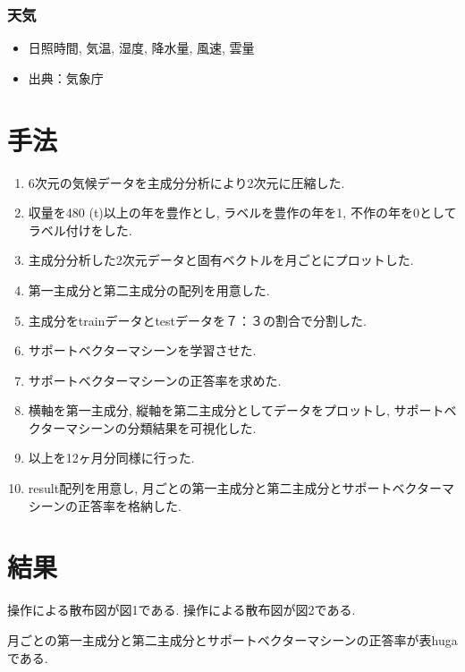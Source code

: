 \documentclass[
]{article}
\begin{document}
\hypertarget{header-n2019}{%
\subsubsection{天気}\label{header-n2019}}

\begin{itemize}
\item
  日照時間, 気温, 湿度, 降水量, 風速, 雲量
\item
  出典：気象庁
\end{itemize}

\hypertarget{header-n2026}{%
\section{手法}\label{header-n2026}}

\begin{enumerate}
\def\labelenumi{\arabic{enumi}.}
\item
  6次元の気候データを主成分分析により2次元に圧縮した.
\item
  収量を480 (t)以上の年を豊作とし, ラベルを豊作の年を1,
  不作の年を0としてラベル付けをした.
\item
  主成分分析した2次元データと固有ベクトルを月ごとにプロットした.
\item
  第一主成分と第二主成分の配列を用意した.
\item
  主成分をtrainデータとtestデータを７：３の割合で分割した.
\item
  サポートベクターマシーンを学習させた.
\item
  サポートベクターマシーンの正答率を求めた.
\item
  横軸を第一主成分, 縦軸を第二主成分としてデータをプロットし,
  サポートベクターマシーンの分類結果を可視化した.
\item
  以上を12ヶ月分同様に行った.
\item
  result配列を用意し,
  月ごとの第一主成分と第二主成分とサポートベクターマシーンの正答率を格納した.
\end{enumerate}

\hypertarget{header-n2048}{%
\section{結果}\label{header-n2048}}

操作による散布図が図1である. 操作による散布図が図2である.

月ごとの第一主成分と第二主成分とサポートベクターマシーンの正答率が表hugaである.
\end{document}
